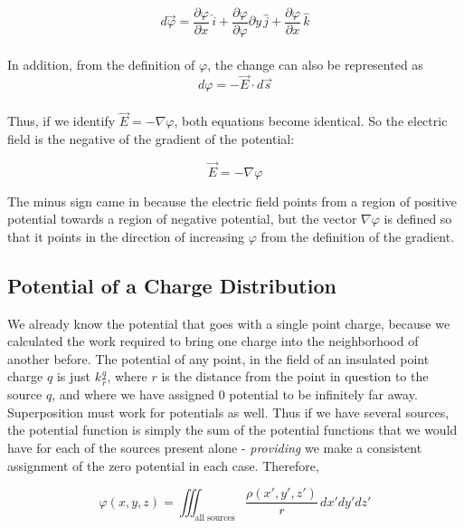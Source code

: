\documentclass[svgnames]{article}
\begin{document}
\[d\vec{\varphi} = \frac{\partial \varphi}{\partial x} \, \hat{i}
+ \frac{\partial \varphi}{\partial \varphi}{\partial y} \, \hat{j}
+ \frac{\partial \varphi}{\partial x} \, \hat{k} \] \\

In addition, from the definition of $\varphi$, the change can also be represented as \\

\[ d\varphi = - \vec{E} \cdot d\vec{s} \] \\

Thus, if we identify $\vec{E} = - \nabla \varphi$, both equations become
identical. So the electric field is the negative of the gradient of the
potential:\\

\begin{tcolorbox}[colback = red!5!white, colframe = red!50!black]
 \[ \vec{E} = - \nabla \varphi \] 
\end{tcolorbox}
 
 The minus sign came in because the electric field points from a region of
 positive potential towards a region of negative potential, but the vector
 $\nabla \varphi$ is defined so that it points in the direction of increasing
 $\varphi$ from the definition of the gradient. \\
 
 \subsection{Potential of a Charge Distribution}
 
 We already know the potential that goes with a single point charge, because we
 calculated the work required to bring one charge into the neighborhood of
 another before. The potential of any point, in the field of an insulated point
 charge $q$ is just $k\frac{q}{r}$, where $r$ is the distance from the point in
 question to the source $q$, and where we have assigned 0 potential to be
 infinitely far away.  \\
 
 Superposition must work for potentials as well. Thus if we have several
 sources, the potential function is simply the sum of the potential functions
 that we would have for each of the sources present alone - \textit{providing}
 we make a consistent assignment of the zero potential in each case. Therefore,
 
 \[ \varphi(x, y, z) = \iiint_\text{all sources} \frac{\rho (x', y', z')}{r} \,
 dx'dy'dz' \] \\
 
\end{document}
